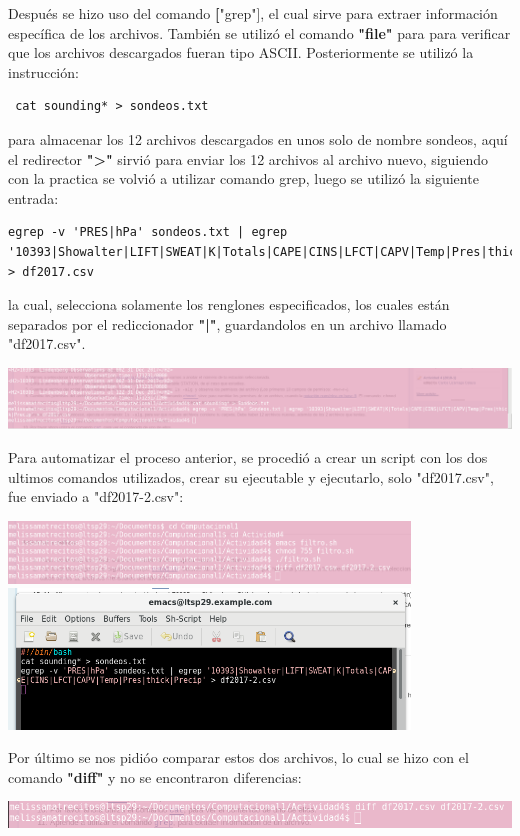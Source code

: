 \documentclass{article}
\begin{document}
Después se hizo uso del comando \textbf["grep"], el cual sirve para extraer información específica de los archivos. También se utilizó el comando \textbf{"file"} para para verificar que los archivos descargados fueran tipo ASCII.
Posteriormente se utilizó la instrucción:
\begin{verbatim} cat sounding* > sondeos.txt
\end{verbatim}
para almacenar los 12 archivos descargados en unos solo de nombre sondeos, aquí el redirector \textbf{">"} sirvió para enviar los 12 archivos al archivo nuevo, siguiendo con la practica se volvió a utilizar comando grep, luego se utilizó la siguiente entrada:
\begin{verbatim}
egrep -v 'PRES|hPa' sondeos.txt | egrep '10393|Showalter|LIFT|SWEAT|K|Totals|CAPE|CINS|LFCT|CAPV|Temp|Pres|thick|Precip' > df2017.csv
\end{verbatim}
la cual, selecciona solamente los renglones especificados, los cuales están separados por el rediccionador \textbf{"|"}, guardandolos en un archivo llamado "df2017.csv".
\begin{center}
 \includegraphics[width=1\textwidth]{egrep.png}

\end{center}
 Para automatizar el proceso anterior, se procedió a crear un script con los dos ultimos comandos utilizados, crear su ejecutable y ejecutarlo, solo "df2017.csv", fue enviado a "df2017-2.csv":
 \begin{center}
 \includegraphics[width=0.8\textwidth]{egrepa.png}
\includegraphics[width=0.8\textwidth]{egrepa2.png}
\end{center}

Por último se nos pidióo comparar estos dos archivos, lo cual se hizo con el comando \textbf{"diff"} y no se encontraron diferencias:
 \begin{center}
 \includegraphics[width=1\textwidth]{diff.png}

\end{center}
\end{document}

